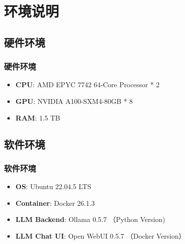 \section{环境说明}
\subsection{硬件环境}

\begin{frame}
\frametitle{硬件环境}
\begin{itemize}
    \item \textbf{CPU}: AMD EPYC 7742 64-Core Processor * 2
    \item \textbf{GPU}: NVIDIA A100-SXM4-80GB * 8
    \item \textbf{RAM}: 1.5 TB
\end{itemize}
\end{frame}


\subsection{软件环境}

\begin{frame}
\frametitle{软件环境}
\begin{itemize}
    \item \textbf{OS}: Ubuntu 22.04.5 LTS
    \item \textbf{Container}: Docker 26.1.3
    \item \textbf{LLM Backend}: Ollama 0.5.7 （Python Version)
    \item \textbf{LLM Chat UI}: Open WebUI 0.5.7 （Docker Version）
\end{itemize}
\end{frame}